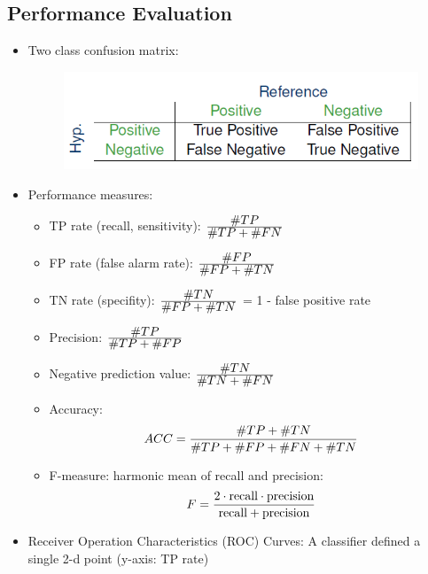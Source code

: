 \subsection*{Performance Evaluation}
\begin{itemize}
    \item
        Two class confusion matrix:
\begin{figure}[H]
    \centering
    \includegraphics[scale=0.7]{figures/conf_two}
\end{figure}
    \item
        Performance measures:
        \begin{itemize}
            \item
                TP rate (recall, sensitivity):  $\frac{\displaystyle \#TP}{\displaystyle \#TP + \#FN}$
            \item
                FP rate (false alarm rate):  $\frac{\displaystyle \#FP}{\displaystyle \#FP+\#TN}$ 
            \item
                TN rate (specifity): $\frac{\displaystyle \#TN}{\displaystyle \#FP+\#TN}$ = 1 - false positive rate
            \item
                Precision: $\frac{\displaystyle \#TP}{\displaystyle \#TP+\#FP}$ 
            \item
                Negative prediction value: $\frac{\displaystyle \#TN}{\displaystyle \#TN+\#FN}$
            \item
                Accuracy: $$ACC = \frac{\displaystyle \#TP + \#TN}{\displaystyle \#TP + \#FP + \#FN + \#TN}$$ 
            \item
                F-measure: harmonic mean of recall and precision: $$F = \frac{\displaystyle 2\cdot \text{recall} \cdot \text{precision}}{\displaystyle \text{recall} + \text{precision}}$$
        \end{itemize}
    \item
        Receiver Operation Characteristics (ROC) Curves: A classifier defined a single 2-d point (y-axis: TP rate)
        \begin{figure}[H]

\end{figure}
\end{itemize}
